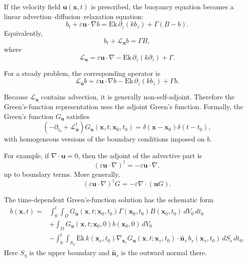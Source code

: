 \documentclass[10pt]{amsart}
\begin{document}
If the velocity field \(\mathbf u(\mathbf x,t)\) is prescribed, the buoyancy equation becomes a linear advection--diffusion--relaxation equation:
\begin{equation}
b_t+\varepsilon \mathbf u\cdot\nabla b
=
\mathrm{Ek}\,\partial_z(k b_z)+\Gamma(B-b).
\end{equation}
Equivalently,
\begin{equation}
b_t+\mathcal L_{\mathbf u} b=\Gamma B,
\end{equation}
where
\begin{equation}
\mathcal L_{\mathbf u}
=
\varepsilon \mathbf u\cdot\nabla
-\mathrm{Ek}\,\partial_z(k\partial_z)
+\Gamma.
\end{equation}

For a steady problem, the corresponding operator is
\begin{equation}
\mathcal L_{\mathbf u} b
=
\varepsilon \mathbf u\cdot\nabla b
-\mathrm{Ek}\,\partial_z(k b_z)
+\Gamma b.
\end{equation}

Because \(\mathcal L_{\mathbf u}\) contains advection, it is generally non-self-adjoint. Therefore the Green's-function representation uses the adjoint Green's function. Formally, the Green's function \(G_{\mathbf u}\) satisfies
\begin{equation}
\left(
-\partial_{t_0}
+\mathcal L_{\mathbf u}^{\dagger}
\right)
G_{\mathbf u}(\mathbf x,t;\mathbf x_0,t_0)
=
\delta(\mathbf x-\mathbf x_0)\delta(t-t_0),
\end{equation}
with homogeneous versions of the boundary conditions imposed on \(b\).

For example, if \(\nabla\cdot\mathbf u=0\), then the adjoint of the advective part is
\[
(\varepsilon\mathbf u\cdot\nabla)^\dagger
=
-\varepsilon\mathbf u\cdot\nabla,
\]
up to boundary terms. More generally,
\[
(\varepsilon\mathbf u\cdot\nabla)^\dagger G
=
-\varepsilon\nabla\cdot(\mathbf u G).
\]

The time-dependent Green's-function solution has the schematic form
\begin{align}
b(\mathbf x,t)
={}&
\int_{0}^{t}\int_{\Omega}
G_{\mathbf u}(\mathbf x,t;\mathbf x_0,t_0)
\Gamma(\mathbf x_0,t_0)B(\mathbf x_0,t_0)
\,dV_0\,dt_0
\nonumber \\
&+
\int_{\Omega}
G_{\mathbf u}(\mathbf x,t;\mathbf x_0,0)
b(\mathbf x_0,0)\,dV_0
\nonumber \\
&-
\int_{0}^{t}\int_{S_\eta}
\mathrm{Ek}\,k(\mathbf x_s,t_0)
\nabla_{\mathbf x_s}G_{\mathbf u}(\mathbf x,t;\mathbf x_s,t_0)
\cdot \hat{\mathbf n}_s\,
b_s(\mathbf x_s,t_0)
\,dS_s\,dt_0.
\end{align}
Here \(S_\eta\) is the upper boundary and \(\hat{\mathbf n}_s\) is the outward normal there.
\end{document}
